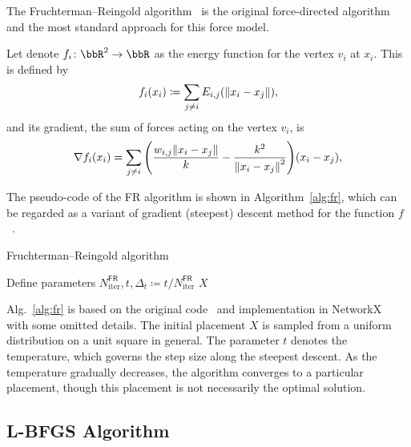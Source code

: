 \documentclass[dvipdfmx,10pt,journal,compsoc]{IEEEtran}
\newcommand{\defeq}{\coloneqq}
\begin{document}
The Fruchterman--Reingold algorithm~\cite{fruchtermanGraphDrawingForcedirected1991} is the original force-directed algorithm and the most standard approach for this force model.

Let denote $f_i\colon \bbR^2 \to \bbR$ as the energy function for the vertex $v_i$ at $x_i$. This is defined by
\begin{equation}\label{eq:fi}
  f_i(x_i) \defeq \sum_{j \neq i} E_{i,j}(\norm{x_i - x_j}),
\end{equation}
and its gradient, the sum of forces acting on the vertex $v_i$, is
\begin{equation}\label{eq:gradientFi}
  \nabla f_i(x_i) = \sum_{j \neq i} \qty(\frac{w_{i,j}\norm{x_i - x_j}}{k} - \frac{k^2}{\norm{x_i - x_j}^2}) (x_i-x_j),
\end{equation}

The pseudo-code of the FR algorithm is shown in Algorithm~\ref{alg:fr}, which can be regarded as a variant of gradient (steepest) descent method for the function $f$~\cite{tunkelang1999numerical}.
\begin{algorithm}[h]
  \caption{Fruchterman--Reingold algorithm}
  \label{alg:fr}

  Define parameters $N_\mathrm{iter}^\mathsf{FR}, t, \Delta_t \defeq t/N_\mathrm{iter}^\mathsf{FR}$\;
  \Return $X$\;
\end{algorithm}

Alg.~\ref{alg:fr} is based on the original code~\cite{fruchtermanGraphDrawingForcedirected1991} and implementation in NetworkX~\cite{hagberg2008exploring} with some omitted details.
The initial placement $X$ is sampled from a uniform distribution on a unit square in general.
The parameter $t$ denotes the temperature, which governs the step size along the steepest descent. As the temperature gradually decreases, the algorithm converges to a particular placement, though this placement is not necessarily the optimal solution.

\subsection{L-BFGS Algorithm}\label{ssec:lbfgs}
\end{document}
